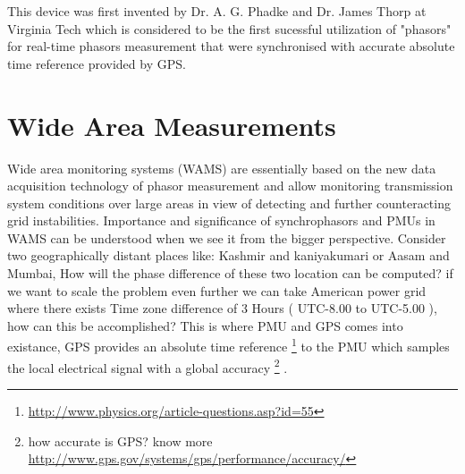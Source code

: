 This device was first invented by Dr. A. G. Phadke and Dr. James Thorp at Virginia Tech which is considered to be the first sucessful utilization of "phasors" for real-time phasors measurement that were synchronised with accurate absolute time reference provided by GPS.

\section{Wide Area Measurements}

Wide area monitoring systems (WAMS) are essentially based on the new data acquisition technology of phasor measurement and allow monitoring transmission system conditions over large areas in view of detecting and further counteracting grid instabilities. Importance and significance of synchrophasors and PMUs in WAMS can be understood when we see it from the bigger perspective. Consider two geographically distant places like: Kashmir and kaniyakumari or Aasam and Mumbai, How will the phase difference of these two location can be computed? if we want to scale the problem even further we can take American power grid where there exists Time zone difference of 3 Hours ( UTC-8.00 to UTC-5.00 ), how can this be accomplished? This is where PMU and GPS comes into existance, GPS provides an absolute time reference \footnote{\url{http://www.physics.org/article-questions.asp?id=55}} to the PMU which samples the local electrical signal with a global accuracy \footnote{how accurate is GPS? know more \url{http://www.gps.gov/systems/gps/performance/accuracy/}} .